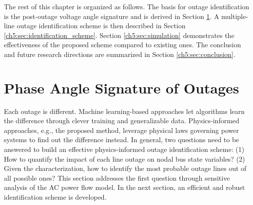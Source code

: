 The rest of this chapter is organized as follows. The basis for outage identification is the post-outage voltage angle signature and is derived in Section \ref{ch5:sec:angle_signature}. A multiple-line outage identification scheme is then described in Section \ref{ch5:sec:identification_scheme}. Section \ref{ch5:sec:simulation} demonstrates the effectiveness of the proposed scheme compared to existing ones. The conclusion and future research directions are summarized in Section \ref{ch5:sec:conclusion}. 


\section{Phase Angle Signature of Outages}
\label{ch5:sec:angle_signature}

Each outage is different. Machine learning-based approaches let algorithms learn the difference through clever training and generalizable data. Physics-informed approaches, e.g., the proposed method, leverage physical laws governing power systems to find out the difference instead. In general, two questions need to be answered to build an effective physics-informed outage identification scheme: (1) How to quantify the impact of each line outage on nodal bus state variables? (2) Given the characterization, how to identify the most probable outage lines out of all possible ones? This section addresses the first question through sensitive analysis of the AC power flow model. In the next section, an efficient and robust identification scheme is developed. 

